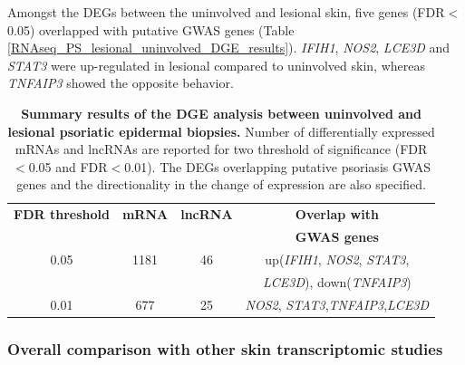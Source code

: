Amongst the DEGs between the uninvolved and lesional skin, five genes (FDR$<$0.05) overlapped with putative GWAS genes (Table \ref{RNAseq_PS_lesional_uninvolved_DGE_results}). \textit{IFIH1}, \textit{NOS2}, \textit{LCE3D} and \textit{STAT3} were up-regulated in lesional compared to uninvolved skin, whereas \textit{TNFAIP3} showed the opposite behavior.



\begin{table}[htbp]
\centering
\begin{tabular}{@{} c c c c}
\toprule
\textbf{FDR threshold}   & \textbf{mRNA}   & \textbf{lncRNA}  & \textbf{Overlap with}\\
                         &                 &                  & \textbf{GWAS genes}\\
\midrule
\midrule
0.05                     & 1181            & 46               &  up(\textit{IFIH1}, \textit{NOS2}, \textit{STAT3},\\ 
                         &                 &                  &  \textit{LCE3D}), down(\textit{TNFAIP3}) \\
0.01                     &  677            & 25               &  \textit{NOS2}, \textit{STAT3},\textit{TNFAIP3},\textit{LCE3D} \\
\bottomrule 
\end{tabular}
\medskip %
\caption[Summary results of the DGE analysis between uninvolved and lesional psoriatic epidermal biopsies.]{\textbf{Summary results of the DGE analysis between uninvolved and lesional psoriatic epidermal biopsies.} Number of differentially expressed mRNAs and lncRNAs are reported for two threshold of significance (FDR$<$0.05 and FDR$<$0.01). The DEGs overlapping putative psoriasis GWAS genes and the directionality in the change of expression are also specified.}
\label{tab:RNAseq_PS_lesional_uninvolved_DGE_results}
\end{table}
\bigskip %




\subsubsection{Overall comparison with other skin transcriptomic studies}

